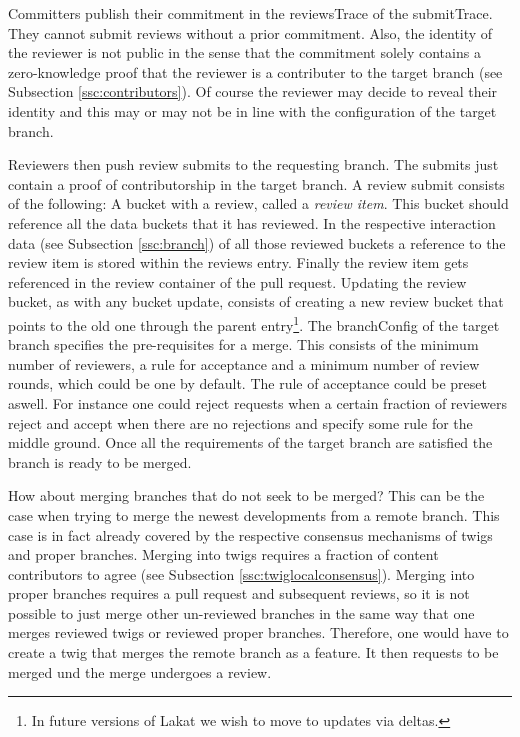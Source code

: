 Committers publish their commitment in the reviewsTrace of the submitTrace. They cannot submit reviews without a prior commitment. Also, the identity of the reviewer is not public in the sense that the commitment solely contains a zero-knowledge proof that the reviewer is a contributer to the target branch (see Subsection \ref{ssc:contributors}).
Of course the reviewer may decide to reveal their identity and this may or may not be in line with the configuration of the target branch.

Reviewers then push review submits to the requesting branch. The submits just contain a proof of contributorship in the target branch. A review submit consists of the following: A bucket with a review, called a \textit{review item}. This bucket should reference all the data buckets that it has reviewed. In the respective interaction data (see Subsection \ref{ssc:branch}) of all those reviewed buckets a reference to the review item is stored within the reviews entry. Finally the review item gets referenced in the review container of the pull request. Updating the review bucket, as with any bucket update, consists of creating a new review bucket that points to the old one through the parent entry\footnote{In future versions of Lakat we wish to move to updates via deltas.}. The branchConfig of the target branch specifies the pre-requisites for a merge. This consists of the minimum number of reviewers, a rule for acceptance and a minimum number of review rounds, which could be one by default. The rule of acceptance could be preset aswell. For instance one could reject requests when a certain fraction of reviewers reject and accept when there are no rejections and specify some rule for the middle ground. Once all the requirements of the target branch are satisfied the branch is ready to be merged. 

How about merging branches that do not seek to be merged? This can be the case when trying to merge the newest developments from a remote branch. This case is in fact already covered by the respective consensus mechanisms of twigs and proper branches. Merging into twigs requires a fraction of content contributors to agree (see Subsection \ref{ssc:twiglocalconsensus}). Merging into proper branches requires a pull request and subsequent reviews, so it is not possible to just merge other un-reviewed branches in the same way that one merges reviewed twigs or reviewed proper branches. Therefore, one would have to create a twig that merges the remote branch as a feature. It then requests to be merged und the merge undergoes a review. 



